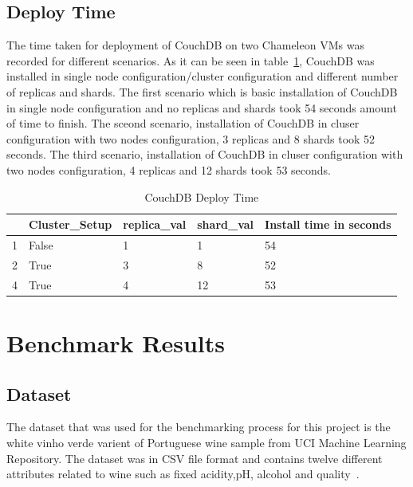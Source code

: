 \subsection{Deploy Time}
The time taken for deployment of CouchDB on two Chameleon VMs was recorded for different
scenarios. As it can be seen in table~\ref{t:CouchDB-DeployTime},
CouchDB was installed in single node configuration/cluster configuration and different
number of replicas and shards. The first scenario which is basic installation of CouchDB
in single node configuration and no replicas and shards took 54 seconds
amount of time to finish. The sceond scenario, installation of CouchDB
in cluser configuration with two nodes configuration, 3 replicas and
8 shards took 52 seconds. The third scenario, installation of CouchDB
in cluser configuration with two nodes configuration, 4 replicas and
12 shards took 53 seconds. 

\begin{table}[]
\centering
\caption{CouchDB Deploy Time}
\label{t:CouchDB-DeployTime}
\begin{tabular}{|l|l|l|l|l|}
\hline
  & \textbf{Cluster\_Setup} & \textbf{replica\_val} & \textbf{shard\_val} & \textbf{Install time in seconds} \\ \hline
1 & False                   & 1                     & 1                   & 54                               \\ \hline
2 & True                    & 3                     & 8                   & 52                               \\ \hline
4 & True                    & 4                     & 12                  & 53                               \\ \hline
\end{tabular}
\end{table}

\section{Benchmark Results}
\subsection{Dataset}
The dataset that was used for the benchmarking process for this
project is the white vinho verde varient of Portuguese wine sample
from UCI Machine Learning Repository. The dataset was in CSV file
format and contains twelve different attributes related to wine such
as fixed acidity,pH, alcohol and quality~\cite{www-WineQuality}. 

